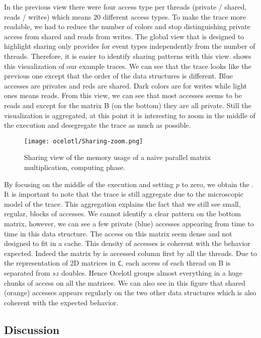 In the previous view there were four access type per threads (private / shared, reads / writes) which means $20$ different access types.
To make the trace more readable, we had to reduce the number of colors and stop distinguishing private access from shared and reads from writes.
The global view that is designed to highlight sharing only provides for event types independently from the number of threads.
Therefore, it is easier to identify sharing patterns with this view.
 shows this visualization of our example traces.
We can see that the trace looks like the previous one except that the order of the data structures is different.
Blue accesses are privates and reds are shared.
Dark colors are for writes while light ones means reads.
From this view, we can see that most accesses seems to be reads and except for the matrix B (on the bottom) they are all private.
Still the visualization is aggregated, at this point it is interesting to zoom in the middle of the execution and desegregate the trace as much as possible.

\begin{figure}[htb]
    \centering
    \texttt{[image: ocelotl/Sharing-zoom.png]}
    \caption{Sharing view of the memory usage of a naive parallel matrix multiplication, computing phase.}
    \label{fig:ocelotl-Carto-zoom}
\end{figure}

By focusing on the middle of the execution and setting $p$ to zero, we obtain the .
It is important to note that the trace is still aggregate due to the microscopic model of the trace.
This aggregation explains the fact that we still see small, regular, blocks of accesses.
We cannot identify a clear pattern on the bottom matrix, however, we can see a few private (blue) accesses appearing from time to time in this data structure.
The access on this matrix seem dense and not designed to fit in a cache.
This density of accesses is coherent with the behavior expected.
Indeed the matrix by is accessed column first by all the threads.
Due to the representation of 2D matrices in \texttt{C}, each access of each thread on B is separated from $sz$ doubles.
Hence \gls{Ocelotl} groups almost everything in a huge chunks of access on all the matrices.
We can also see in this figure that shared (orange) accesses appears regularly on the two other data structures which is also coherent with the expected behavior.

\subsection{Discussion}

